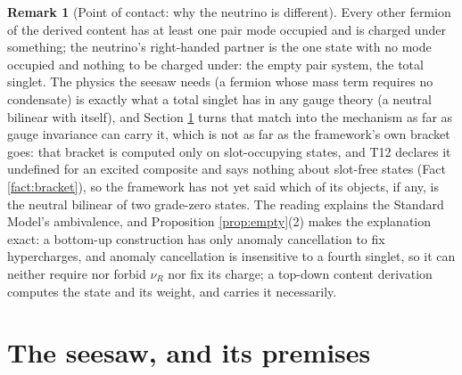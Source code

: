 \documentclass[11pt]{article}
\theoremstyle{definition}
\newtheorem{remark}[theorem]{Remark}
\begin{document}
\begin{remark}[Point of contact: why the neutrino is different]\label{rem:different}
Every other fermion of the derived content has at least one pair mode occupied and is charged under something; the neutrino's right-handed partner is the one state with no mode occupied and nothing to be charged under: the empty pair system, the total singlet. The physics the seesaw needs (a fermion whose mass term requires no condensate) is exactly what a total singlet has in any gauge theory (a neutral bilinear with itself), and Section \ref{sec:seesaw} turns that match into the mechanism as far as gauge invariance can carry it, which is not as far as the framework's own bracket goes: that bracket is computed only on slot-occupying states, and T12 declares it undefined for an excited composite and says nothing about slot-free states (Fact \ref{fact:bracket}), so the framework has not yet said which of its objects, if any, is the neutral bilinear of two grade-zero states. The reading explains the Standard Model's ambivalence, and Proposition \ref{prop:empty}(2) makes the explanation exact: a bottom-up construction has only anomaly cancellation to fix hypercharges, and anomaly cancellation is insensitive to a fourth singlet, so it can neither require nor forbid $\nu_{R}$ nor fix its charge; a top-down content derivation computes the state and its weight, and carries it necessarily.
\end{remark}

\section{The seesaw, and its premises}\label{sec:seesaw}
\end{document}
